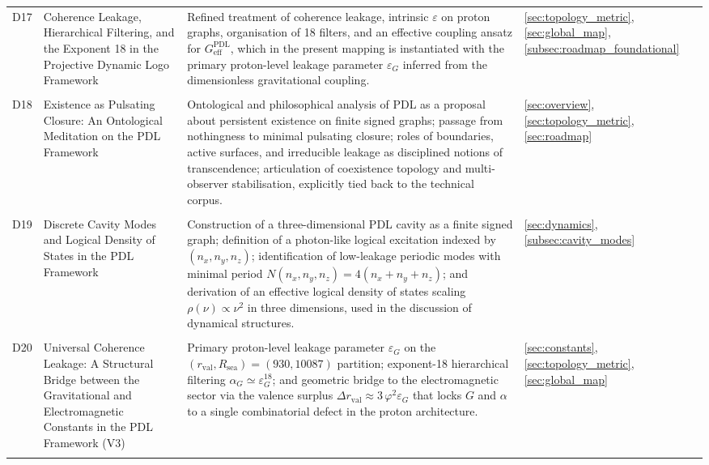 \documentclass[11pt,a4paper]{article}
\newcommand{\PDL}{\mathrm{PDL}}
\begin{document}
\begin{longtable}{@{}p{0.9cm}L{5cm}L{6.5cm}L{2.4cm}@{}}
  D17 &
  Coherence Leakage, Hierarchical Filtering, and the Exponent 18 in the Projective Dynamic Logo Framework &
  Refined treatment of coherence leakage, intrinsic $\varepsilon$ on proton graphs, organisation of 18 filters, and an effective coupling ansatz for $G_{\mathrm{eff}}^{\PDL}$, which in the present mapping is instantiated with the primary proton-level leakage parameter $\varepsilon_G$ inferred from the dimensionless gravitational coupling.
 &
  \ref{sec:topology_metric}, \ref{sec:global_map}, \ref{subsec:roadmap_foundational} \\\\[0.4em] 

  D18 & 
  Existence as Pulsating Closure: An Ontological Meditation on the PDL Framework & Ontological and philosophical analysis of PDL as a proposal about persistent existence on finite signed graphs; passage from nothingness to minimal pulsating closure; roles of boundaries, active surfaces, and irreducible leakage as disciplined notions of transcendence; articulation of coexistence topology and multi-observer stabilisation, explicitly tied back to the technical corpus. & 
  \ref{sec:overview}, \ref{sec:topology_metric}, \ref{sec:roadmap} \\\\[0.4em] 
  
  D19 & 
  Discrete Cavity Modes and Logical Density of States in the PDL Framework & Construction of a three-dimensional PDL cavity as a finite signed graph; definition of a photon-like logical excitation indexed by $(n_x,n_y,n_z)$; identification of low-leakage periodic modes with minimal period $N(n_x,n_y,n_z)=4(n_x+n_y+n_z)$; and derivation of an effective logical density of states scaling $\rho(\nu)\propto \nu^2$ in three dimensions, used in the discussion of dynamical structures. & 
  \ref{sec:dynamics}, \ref{subsec:cavity_modes} \\\\[0.4em]

  D20 &
  {Universal Coherence Leakage: A Structural Bridge between the Gravitational and Electromagnetic Constants in the PDL Framework} (V3) &
  Primary proton-level leakage parameter $\varepsilon_G$ on the $(r_{\mathrm{val}},R_{\mathrm{sea}})=(930,10087)$ partition; exponent-18 hierarchical filtering $\alpha_G \simeq \varepsilon_G^{18}$; and geometric bridge to the electromagnetic sector via the valence surplus $\Delta r_{\mathrm{val}} \approx 3\,\varphi^2 \varepsilon_G$ that locks $G$ and $\alpha$ to a single combinatorial defect in the proton architecture. &
  \ref{sec:constants}, \ref{sec:topology_metric}, \ref{sec:global_map} \\\\[0.4em]


\end{longtable}
\end{document}
